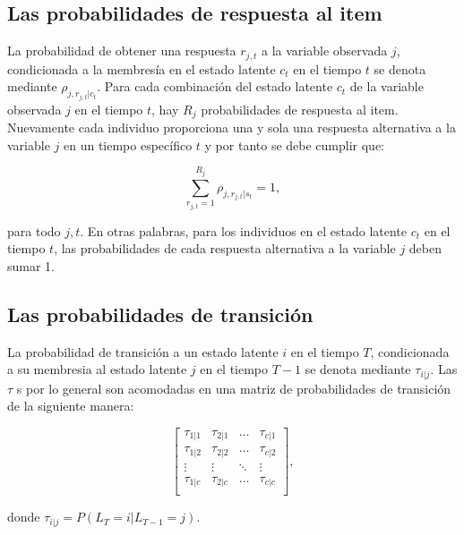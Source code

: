 			\subsection{Las probabilidades de respuesta al item}
			La probabilidad de obtener una respuesta ${ r }_{ j,t }$ a la variable observada $j$, condicionada a la membres\'{i}a en el estado latente ${ c }_{ t }$ en el tiempo $t$ se denota mediante ${ \rho  }_{ j,{ r }_{ j,t }|{ c }_{ t } }$. Para cada combinaci\'{o}n del estado latente $c_{t}$ de la variable observada $j$ en el tiempo $t$, hay $R_{j}$ probabilidades de respuesta al item. Nuevamente cada individuo proporciona una y sola una respuesta alternativa a la variable $j$ en un tiempo espec\'{i}fico $t$ y por tanto se debe cumplir que: 
			
			\begin{equation}
				\sum _{ { r }_{ j,t }=1 }^{ { R }_{ j } }{ { \rho  }_{ j,{ r }_{ j,t }|{ s }_{ t } }=1 }, \label{2.19}
			\end{equation}
			
			para todo $j,t$. En otras palabras, para los individuos en el estado latente ${ c }_{ t }$ en el tiempo $t$, las probabilidades de cada respuesta alternativa a la variable $j$ deben sumar 1.
			
		\subsection{Las probabilidades de transici\'{o}n}
			La probabilidad de transici\'{o}n a un estado latente $i$ en el tiempo $T$, condicionada a su membresia al estado latente $j$ en el tiempo $T-1$ se denota mediante ${ \tau  }_{ i|j }$.
			Las $\tau$ s por lo general son acomodadas en una matriz de probabilidades de transici\'{o}n de la siguiente manera:
			
			\begin{equation} 
				\left[ \begin{array}{cccc} 
					\tau_{1|1} & \tau_{2|1} & \ldots & \tau_{c|1} \\  
					\tau_{1|2} & \tau_{2|2} & \ldots & \tau_{c|2} \\    
					\vdots & \vdots & \ddots & \vdots \\
					\tau_{1|c} & \tau_{2|c} & \ldots & \tau_{c|c} \\    
				\end{array} \right] , \label{2.20}
			\end{equation}
			
			donde ${ \tau  }_{ i|j }=P({ L }_{ T }=i|{ L }_{ T-1 }=j)$.\\
			
